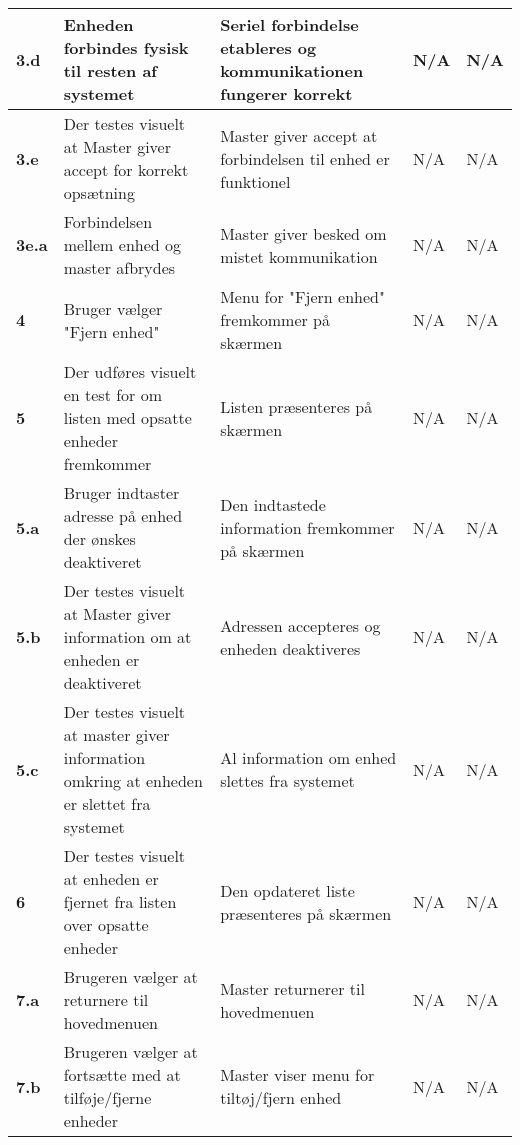 \begin{center}
\begin{longtable}{|p{}|p{}|p{}|p{}|p{}|}
\textbf{3.d}&Enheden forbindes fysisk til resten af systemet
			&Seriel forbindelse etableres og kommunikationen fungerer korrekt 
			&N/A
			&N/A \\\hline  
			
\textbf{3.e}&Der testes visuelt at Master giver accept for korrekt opsætning
			&Master giver accept at forbindelsen til enhed er funktionel
			&N/A 
			&N/A \\\hline 
			
\textbf{3e.a}&Forbindelsen mellem enhed og master afbrydes
			&Master giver besked om mistet kommunikation
			&N/A 
			&N/A \\\hline
			
\textbf{4}	&Bruger vælger "Fjern enhed" 
			&Menu for "Fjern enhed" fremkommer på skærmen 
			&N/A 
			&N/A \\\hline
			 
\textbf{5}	&Der udføres visuelt en test for om listen med opsatte enheder fremkommer 
			&Listen præsenteres på skærmen 
			&N/A 
			&N/A \\\hline
			 
\textbf{5.a}&Bruger indtaster adresse på enhed der ønskes deaktiveret 
			&Den indtastede information fremkommer på skærmen
			&N/A 
			&N/A \\\hline
			 
\textbf{5.b}&Der testes visuelt at Master giver information om at enheden er deaktiveret
			&Adressen accepteres og enheden deaktiveres
			&N/A 
			&N/A \\\hline
			
\textbf{5.c}&Der testes visuelt at master giver information omkring at enheden er slettet fra systemet
			&Al information om enhed slettes fra systemet 
			&N/A 
			&N/A \\\hline
			 
\textbf{6}	&Der testes visuelt at enheden er fjernet fra listen over opsatte enheder 
			&Den opdateret liste præsenteres på skærmen 
			&N/A 
			&N/A \\\hline
			 
\textbf{7.a}	&Brugeren vælger at returnere til hovedmenuen
			&Master returnerer til hovedmenuen
			&N/A
			&N/A \\\hline

\textbf{7.b}	&Brugeren vælger at fortsætte med at tilføje/fjerne enheder
			&Master viser menu for tiltøj/fjern enhed 
			&N/A
			&N/A \\\hline

\end{longtable}
	\label{ATUC1} 
\end{center}